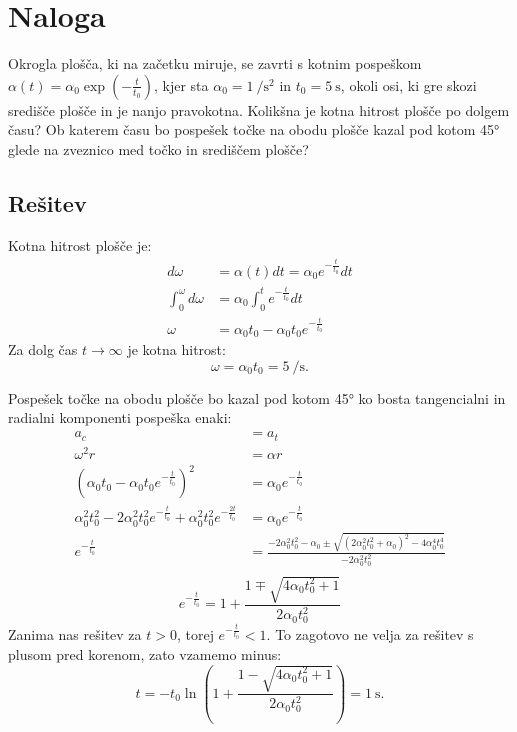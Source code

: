 \documentclass[a4,11pt]{article}
\begin{document}
\section{Naloga}
    Okrogla plošča, ki na začetku miruje, se zavrti s kotnim pospeškom \(\alpha\left(t\right) = \alpha_0 \exp{\left(-\frac{t}{t_0}\right)}\),
    kjer sta \(\alpha_0 = \qty{1}{\per\s\squared}\)
    in \(t_0 = \qty{5}{\s}\), okoli osi, ki gre skozi središče plošče in je nanjo pravokotna.
    Kolikšna je kotna hitrost plošče po dolgem času? Ob katerem času bo pospešek točke na
    obodu plošče kazal pod kotom \ang{45} glede na zveznico med točko in središčem plošče?

\subsection*{Rešitev}
    Kotna hitrost plošče je:
    \begin{align*}
        d\omega &= \alpha\left(t\right) dt = \alpha_0 e^{-\frac{t}{t_0}} dt \\
        \int_0^\omega d\omega &= \alpha_0 \int_0^t e^{-\frac{t}{t_0}} dt \\
        \omega &= \alpha_0 t_0 - \alpha_0 t_0e^{-\frac{t}{t_0}}
    \end{align*}
    Za dolg čas \(t \to \infty\) je kotna hitrost:
    \[\omega = \alpha_0 t_0 = \qty{5}{\per\s}.\]

    Pospešek točke na obodu plošče bo kazal pod kotom \ang{45} ko bosta tangencialni in radialni komponenti pospeška enaki:
    \begin{align*}
        a_c &= a_t \\
        \omega^2 r &= \alpha r \\
        {\left(\alpha_0 t_0 - \alpha_0 t_0e^{-\frac{t}{t_0}}\right)}^2 &= \alpha_0 e^{-\frac{t}{t_0}} \\
        \alpha_0^2 t_0^2 - 2\alpha_0^2 t_0^2 e^{-\frac{t}{t_0}} + \alpha_0^2 t_0^2 e^{-\frac{2t}{t_0}} &= \alpha_0 e^{-\frac{t}{t_0}} \\
        e^{-\frac{t}{t_0}} &= \frac{-2\alpha_0^2t_0^2 - \alpha_0 \pm \sqrt{{\left(2\alpha_0^2t_0^2 + \alpha_0\right)}^2 - 4\alpha_0^4t_0^4}}{-2\alpha_0^2t_0^2} \\
    \end{align*}
    \[
        e^{-\frac{t}{t_0}} = 1 + \frac{1 \mp \sqrt{4\alpha_0t_0^2 + 1}}{2\alpha_0t_0^2}
    \]
    Zanima nas rešitev za \(t > 0\), torej \(e^{-\frac{t}{t_0}} < 1\). To zagotovo ne velja za rešitev s plusom pred korenom, zato vzamemo minus:
    \[
        t = - t_0 \ln\left(1 + \frac{1 - \sqrt{4\alpha_0t_0^2 + 1}}{2\alpha_0t_0^2}\right) = \qty{1}{\s}.
    \]
\end{document}
